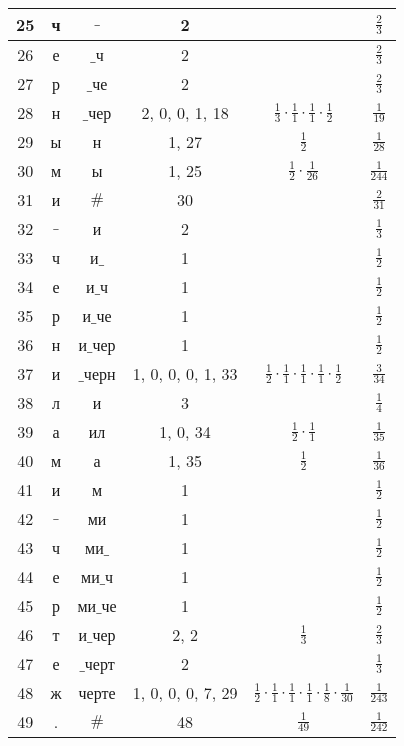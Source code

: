 \begin{tabular}{|c|c|c|c|c|c|}
\hline
25 & ч & $\_$ & 2 &  & $\frac{2}{3}$\\
\hline
26 & е & $\_$ч & 2 &  & $\frac{2}{3}$\\
\hline
27 & р & $\_$че & 2 &  & $\frac{2}{3}$\\
\hline
28 & н & $\_$чер & 2, 0, 0, 1, 18 & $\frac{1}{3} \cdot \frac{1}{1} \cdot \frac{1}{1} \cdot \frac{1}{2}$ & $\frac{1}{19}$\\
\hline
29 & ы & н & 1, 27 & $\frac{1}{2}$ & $\frac{1}{28}$\\
\hline
30 & м & ы & 1, 25 & $\frac{1}{2} \cdot \frac{1}{26}$ & $\frac{1}{244}$\\
\hline
31 & и & $\#$ & 30 &  & $\frac{2}{31}$\\
\hline
32 & $\_$ & и & 2 &  & $\frac{1}{3}$\\
\hline
33 & ч & и$\_$ & 1 &  & $\frac{1}{2}$\\
\hline
34 & е & и$\_$ч & 1 &  & $\frac{1}{2}$\\
\hline
35 & р & и$\_$че & 1 &  & $\frac{1}{2}$\\
\hline
36 & н & и$\_$чер & 1 &  & $\frac{1}{2}$\\
\hline
37 & и & $\_$черн & 1, 0, 0, 0, 1, 33 & $\frac{1}{2} \cdot \frac{1}{1} \cdot \frac{1}{1} \cdot \frac{1}{1} \cdot \frac{1}{2}$ & $\frac{3}{34}$\\
\hline
38 & л & и & 3 &  & $\frac{1}{4}$\\
\hline
39 & а & ил & 1, 0, 34 & $\frac{1}{2} \cdot \frac{1}{1}$ & $\frac{1}{35}$\\
\hline
40 & м & а & 1, 35 & $\frac{1}{2}$ & $\frac{1}{36}$\\
\hline
41 & и & м & 1 &  & $\frac{1}{2}$\\
\hline
42 & $\_$ & ми & 1 &  & $\frac{1}{2}$\\
\hline
43 & ч & ми$\_$ & 1 &  & $\frac{1}{2}$\\
\hline
44 & е & ми$\_$ч & 1 &  & $\frac{1}{2}$\\
\hline
45 & р & ми$\_$че & 1 &  & $\frac{1}{2}$\\
\hline
46 & т & и$\_$чер & 2, 2 & $\frac{1}{3}$ & $\frac{2}{3}$\\
\hline
47 & е & $\_$черт & 2 &  & $\frac{1}{3}$\\
\hline
48 & ж & черте & 1, 0, 0, 0, 7, 29 & $\frac{1}{2} \cdot \frac{1}{1} \cdot \frac{1}{1} \cdot \frac{1}{1} \cdot \frac{1}{8} \cdot \frac{1}{30}$ & $\frac{1}{243}$\\
\hline
49 & . & $\#$ & 48 & $\frac{1}{49}$ & $\frac{1}{242}$\\
\hline
\end{tabular}

